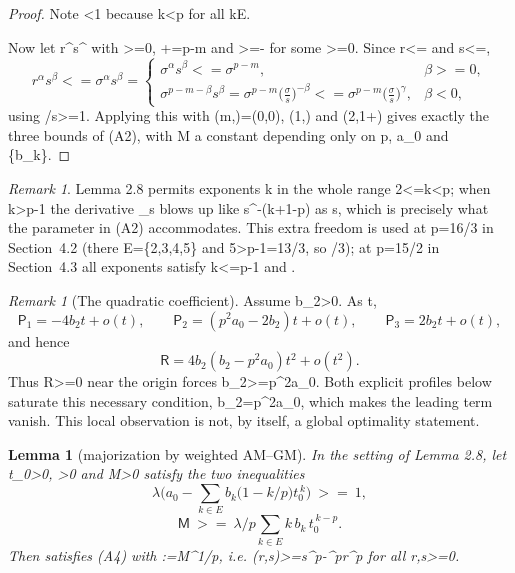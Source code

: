 \documentclass[10pt,reqno]{amsart}
\def\({}\def\){}%
\def\frac#1#2{#1/#2}%
\def\ge{>=}\def\le{<=}%
\newtheorem{lemma}[theorem]{Lemma}
\theoremstyle{definition}
\theoremstyle{remark}
\newtheorem{remark}[theorem]{Remark}
\begin{document}
\begin{proof}
Note \(\theta<1\) because \(k<p\) for all \(k\in E\).

Now let \(r^\alpha s^\beta\) with \(\alpha\ge0\), \(\alpha+\beta=p-m\) and \(\beta\ge-\gamma\) for some \(\gamma\ge0\). Since \(r\le\sigma\) and \(s\le\sigma\), \[r^\alpha s^\beta\le\sigma^\alpha s^\beta=
\begin{cases}\sigma^{\alpha}s^{\beta}\le\sigma^{p-m}, &\beta\ge0,\\[2pt]
\sigma^{p-m-\beta}s^{\beta}=\sigma^{p-m}\big(\tfrac\sigma s\big)^{-\beta}
\le\sigma^{p-m}\big(\tfrac\sigma s\big)^{\gamma}, &\beta<0,\end{cases}\] using \(\sigma/s\ge1\). Applying this with \((m,\gamma)=(0,0)\), \((1,\theta)\) and \((2,1+\theta)\) gives exactly the three bounds of (A2), with \(M\) a constant depending only on \(p\), \(a_0\) and \(\{b_k\}\).
\end{proof}

\begin{remark}\label{rem:2-9}
Lemma 2.8 permits exponents \(k\) in the whole range \(2\le k<p\); when \(k>p-1\) the derivative \(\varphi_s\) blows up like \(s^{-(k+1-p)}\) as \(s\), which is precisely what the parameter \(\theta\) in (A2) accommodates. This extra freedom is used at \(p=\frac{16}3\) in Section~4.2 (there \(E=\{2,3,4,5\}\) and \(5>p-1=\frac{13}3\), so \(\theta=\frac23\)); at \(p=\frac{15}2\) in Section~4.3 all exponents satisfy \(k\le p-1\) and \(\).
\end{remark}

\begin{remark}[The quadratic coefficient]\label{rem:2-10} Assume \(b_2>0\).  As \(t\),
\[\mathsf P_1=-4b_2t+o(t),\qquad
  \mathsf P_2=(p^2a_0-2b_2)t+o(t),\qquad
  \mathsf P_3=2b_2t+o(t),\]
and hence
\[\mathsf R=4b_2(b_2-p^2a_0)t^2+o(t^2).\]
Thus \(\mathsf R\ge0\) near the origin forces
\(b_2\ge p^2a_0\).  Both explicit profiles below saturate this necessary
condition, \(b_2=p^2a_0\), which makes the leading term vanish.  This local
observation is not, by itself, a global optimality statement.
\end{remark}

\begin{lemma}[majorization by weighted AM--GM]\label{lem:2-11}
In the setting of Lemma 2.8, let \(t_0>0\), \(\lambda>0\) and \(\mathsf M>0\) satisfy the two inequalities \[\lambda\Big(a_0-\sum_{k\in E}b_k\Big(1-\frac kp\Big)t_0^{\,k}\Big)\ \ge\ 1,
\tag{M1}\] \[\mathsf M\ \ge\ \frac{\lambda}{p}\sum_{k\in E}k\,b_k\,t_0^{\,k-p}. \tag{M2}\] Then \(\lambda\varphi\) satisfies (A4) with \(\Lambda:=\mathsf M^{1/p}\), i.e. \(\lambda\varphi(r,s)\ge s^p-\Lambda^pr^p\) for all \(r,s\ge0\).
\end{lemma}
\end{document}
